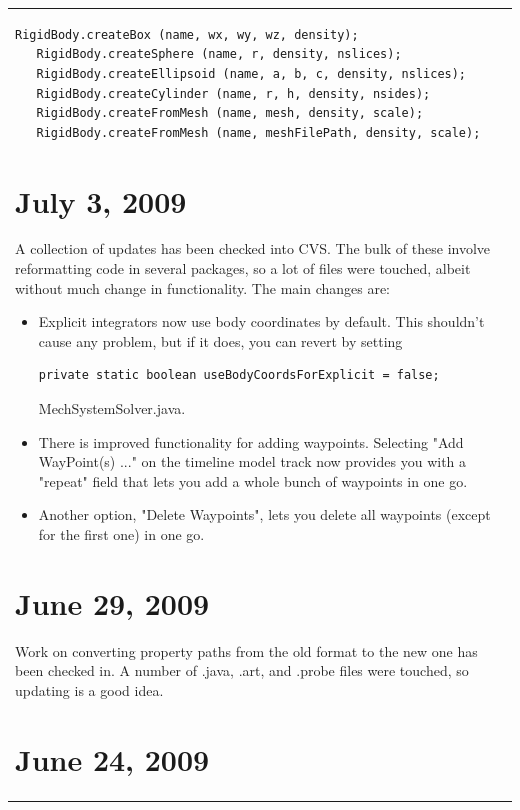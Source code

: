 \documentclass{article}
\begin{document}
\begin{tabular}{ll}
\begin{lstlisting}[]
   RigidBody.createBox (name, wx, wy, wz, density);
   RigidBody.createSphere (name, r, density, nslices);
   RigidBody.createEllipsoid (name, a, b, c, density, nslices);
   RigidBody.createCylinder (name, r, h, density, nsides);
   RigidBody.createFromMesh (name, mesh, density, scale);
   RigidBody.createFromMesh (name, meshFilePath, density, scale);
\end{lstlisting}

\section*{July 3, 2009}

A collection of updates has been checked into CVS. The bulk of these 
involve reformatting code in several packages, so a lot of files were 
touched, albeit without much change in functionality. The main changes 
are:

\begin{itemize}

\item Explicit integrators now use body coordinates by default. This
shouldn't cause any problem, but if it does, you can revert by setting 
\begin{verbatim}
private static boolean useBodyCoordsForExplicit = false;
\end{verbatim}
{\sf MechSystemSolver.java}.

\item There is improved functionality for adding waypoints. Selecting 
{\sf "Add WayPoint(s) ..."} on the timeline model track now provides you 
with a {\sf "repeat"} field that lets you add a whole bunch of waypoints in 
one go.

\item Another option, {\sf "Delete Waypoints"}, lets you delete all waypoints 
(except for the first one) in one go. 

\end{itemize}

\section*{June 29, 2009}

Work on converting property paths from the old format to the new one
has been checked in. A number of .java, .art, and .probe files were 
touched, so updating is a good idea.

\section*{June 24, 2009}


\end{tabular}
\end{document}
